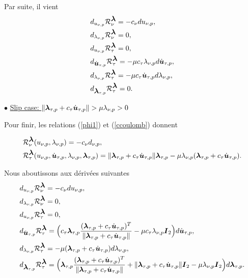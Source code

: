 \noindent Par suite, il vient
\begin{align}
&d_{u_{\nu, p}} {\cal R}_{\nu}^{\mbox{\boldmath{$\lambda$}}}=-c_{\nu}d{u_{\nu, p}}\label{phi11st},\\
&d_{\lambda_{\nu, p}} {\cal R}_{\nu}^{\mbox{\boldmath{$\lambda$}}}=0\label{phi12st},\\
&d_{u_{\nu, p}} {\cal R}_{\tau}^{\mbox{\boldmath{$\lambda$}}}=0,\label{phi21st}\\
&d_{\dot{\mbox{\boldmath{$u$}}}_{\tau, p}} {\cal R}_{\tau}^{\mbox{\boldmath{$\lambda$}}}=-\mu c_\tau \lambda_{\nu, p}d\dot{\mbox{\boldmath{$u$}}}_{\tau, p},\label{phi22st}\\
&d_{\lambda_{\nu, p}} {\cal R}_{\tau}^{\mbox{\boldmath{$\lambda$}}}=-\mu c_\tau \dot{\mbox{\boldmath{$u$}}}_{\tau, p}d{\lambda_{\nu, p}},\label{phi23st}\\
&d_{\mbox{\boldmath{$\lambda$}}_{\tau, p}} {\cal R}_{\tau}^{\mbox{\boldmath{$\lambda$}}}=0\label{phi24st}.
\end{align}

$\bullet$ \underline{Slip case: $\|\blambda_{\tau, p}+c_\tau \dot\bu_{\tau, p}\|> \mu \lambda_{\nu, p}> 0$}

\noindent Pour finir, les relations (\ref{phi1}) et (\ref{ccoulomb}) donnent

\begin{align*}
&{\cal R}_{\nu}^{\mbox{\boldmath{$\lambda$}}}(u_{\nu, p},\lambda_{\nu, p})=-c_{\nu}d_{\nu,p},\\
&{\cal R}_{\tau}^{\mbox{\boldmath{$\lambda$}}}(u_{\nu, p},\dot{\mbox{\boldmath{$u$}}}_{\tau, p},\lambda_{\nu, p},\mbox{\boldmath{$\lambda$}}_{\tau, p})=\|\mbox{\boldmath{$\lambda$}}_{\tau, p}+c_\tau \dot{\mbox{\boldmath{$u$}}}_{\tau, p}\|\mbox{\boldmath{$\lambda$}}_{\tau, p}- \mu\lambda_{\nu, p} (\mbox{\boldmath{$\lambda$}}_{\tau, p}+c_\tau \dot{\mbox{\boldmath{$u$}}}_{\tau, p}).
\end{align*}

\noindent Nous aboutissons aux dérivées suivantes
\begin{align}
&d_{u_{\nu, p}} {\cal R}_{\nu}^{\mbox{\boldmath{$\lambda$}}}=-c_{\nu}d{u_{\nu, p}}\label{phi11sl},\\
&d_{\lambda_{\nu, p}} {\cal R}_{\nu}^{\mbox{\boldmath{$\lambda$}}}=0\label{phi12sl},\\
&d_{u_{\nu, p}} {\cal R}_{\tau}^{\mbox{\boldmath{$\lambda$}}}=0,\label{phi21sl}\\
&d_{\dot{\mbox{\boldmath{$u$}}}_{\tau, p}} {\cal R}_{\tau}^{\mbox{\boldmath{$\lambda$}}}=\Big(c_\tau \mbox{\boldmath{$\lambda$}}_{\tau, p}\frac{(\mbox{\boldmath{$\lambda$}}_{\tau, p}+c_\tau \dot{\mbox{\boldmath{$u$}}}_{\tau, p})^T}{\|\mbox{\boldmath{$\lambda$}}_{\tau, p}+c_\tau \dot{\mbox{\boldmath{$u$}}}_{\tau, p}\|}-\mu c_\tau \lambda_{\nu, p}\mbox{\boldmath{$I$}}_2\Big)d{\dot{\mbox{\boldmath{$u$}}}_{\tau, p}},\label{phi22sl}\\
&d_{\lambda_{\nu, p}} {\cal R}_{\tau}^{\mbox{\boldmath{$\lambda$}}}=- \mu (\mbox{\boldmath{$\lambda$}}_{\tau, p}+c_\tau \dot{\mbox{\boldmath{$u$}}}_{\tau, p})d\lambda_{\nu, p},\label{phi23sl}\\
&d_{\mbox{\boldmath{$\lambda$}}_{\tau, p}} {\cal R}_{\tau}^{\mbox{\boldmath{$\lambda$}}}=\Big( \mbox{\boldmath{$\lambda$}}_{\tau, p}\frac{(\mbox{\boldmath{$\lambda$}}_{\tau, p}+c_\tau \dot{\mbox{\boldmath{$u$}}}_{\tau, p})^T}{\|\mbox{\boldmath{$\lambda$}}_{\tau, p}+c_\tau \dot{\mbox{\boldmath{$u$}}}_{\tau, p}\|} +\|\mbox{\boldmath{$\lambda$}}_{\tau, p}+c_\tau \dot{\mbox{\boldmath{$u$}}}_{\tau, p}\|\mbox{\boldmath{$I$}}_2 - \mu\lambda_{\nu, p}\mbox{\boldmath{$I$}}_2  \Big)d{\mbox{\boldmath{$\lambda$}}_{\tau, p}}\label{phi24sl}.
\end{align}


